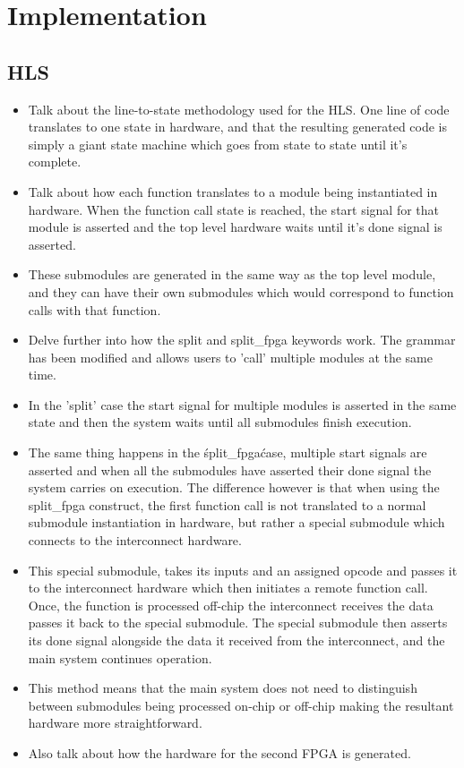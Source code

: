 \chapter{Implementation}

\section{HLS}

\begin{itemize}
    \item Talk about the line-to-state methodology used for the HLS. One line of code translates to one state in hardware, and that the resulting generated code is simply a giant state machine which goes from state to state until it's complete.
    \item Talk about how each function translates to a module being instantiated in hardware. When the function call state is reached, the start signal for that module is asserted and the top level hardware waits until it's done signal is asserted.
    \item These submodules are generated in the same way as the top level module, and they can have their own submodules which would correspond to function calls with that function.
    \item Delve further into how the split and split\_fpga keywords work. The grammar has been modified and allows users to 'call' multiple modules at the same time.
    \item In the 'split' case the start signal for multiple modules is asserted in the same state and then the system waits until all submodules finish execution.
    \item The same thing happens in the \'split\_fpga\' case, multiple start signals are asserted and when all the submodules have asserted their done signal the system carries on execution. The difference however is that when using the split\_fpga construct, the first function call is not translated to a normal submodule instantiation in hardware, but rather a special submodule which connects to the interconnect hardware.
    \item This special submodule, takes its inputs and an assigned opcode and passes it to the interconnect hardware which then initiates a remote function call. Once, the function is processed off-chip the interconnect receives the data passes it back to the special submodule. The special submodule then asserts its done signal alongside the data it received from the interconnect, and the main system continues operation.
    \item This method means that the main system does not need to distinguish between submodules being processed on-chip or off-chip making the resultant hardware more straightforward.
    \item Also talk about how the hardware for the second FPGA is generated.
\end{itemize}

